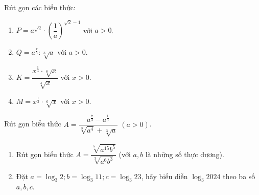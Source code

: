 \begin{bt}%
	Rút gọn các  biểu thức:
	\begin{enumerate}
		 \item $P=a^{\sqrt{2}}\cdot\left( \dfrac{1}{a}\right)^{\sqrt{2}-1}$ với $a>0$.
		\item $Q=a^{\tfrac{7}{3}}:\sqrt[3]a$ với  $a>0$.
		\item $K=\dfrac{x^{\tfrac{1}{3}}\cdot \sqrt[6]{x}}{\sqrt[4]{x}}$ với $x>0$. 
		\item $M=x^{\tfrac{1}{3}}\cdot \sqrt[6]{x}$ với $x>0$. 
	\end{enumerate}
\end{bt}

\begin{ex}%
	Rút gọn biểu thức $A=\dfrac{a^{\frac{7}{3}}-a^{\frac{1}{3}}}{\sqrt[3]{a^4}+\sqrt[3]{a}}$  $(a>0)$.
\end{ex}

\begin{ex}%
	\begin{enumerate}
		\item Rút gọn biểu thức $A=\dfrac{\sqrt[5]{a^{15} b^5}}{\sqrt[3]{a^6 b^3}}$ (với $a, b$ là những  số thực dương).
		\item Đặt  $a=\log_3 2; b=\log_3 11; c=\log_3 23$, hãy biểu diễn $\log_3 2024$ theo ba số $a, b, c$.
	\end{enumerate}
\end{ex}

